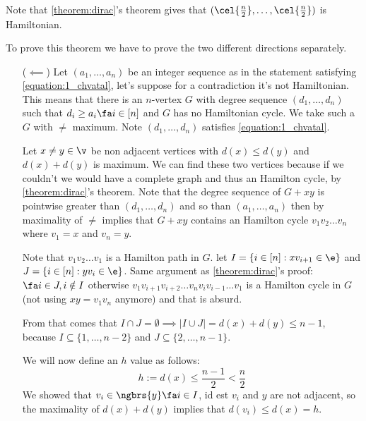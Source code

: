 Note that \ref{theorem:dirac}'s theorem gives that $(\cel{\frac{n}{2}}, \dots, \cel{\frac{n}{2}})$ is Hamiltonian.
\begin{prf}
    To prove this theorem we have to prove the two different directions separately.
    \begin{itemize}
        \item[($\impliedby$)] Let $(a_1, \dots, a_n)$ be an integer sequence as in the statement satisfying \ref{equation:1_chvatal}, let's suppose for a contradiction it's not Hamiltonian. This means that there is an $n$-vertex $G$ with degree sequence $(d_1, \dots, d_n)$ such that $d_i \geq a_i \fa i \in [n]$ and $G$ has no Hamiltonian cycle. We take such a $G$ with $\ne$ maximum. Note $(d_1, \dots, d_n)$ satisfies \ref{equation:1_chvatal}.
        
        Let $x \neq y \in \v$ be non adjacent vertices with $d(x) \leq d(y)$ and $d(x) + d(y)$ is maximum. We can find these two vertices because if we couldn't we would have a complete graph and thus an Hamilton cycle, by \ref{theorem:dirac}'s theorem. Note that the degree sequence of $G + xy$ is pointwise greater than $(d_1, \dots, d_n)$ and so than $(a_1, \dots, a_n)$ then by maximality of $\ne$ implies that $G + xy$ contains an Hamilton cycle $v_1v_2 \dots v_n$ where $v_1 = x$ and $v_n = y$.

        Note that $v_1v_2 \dots v_1$  is a Hamilton path in $G$. let $I = \{i \in [n]: xv_{i + 1} \in \e\}$ and $J = \{i \in [n]: yv_i \in \e\}$. Same argument as \ref{theorem:dirac}'s proof: $\fa i \in J, i \notin I$ otherwise $v_1 v_{i + 1} v_{i + 2} \dots v_n v_i v_{i - 1} \dots v_1$ is a Hamilton cycle in $G$ (not using $xy = v_1v_n$ anymore) and that is absurd.

        From that comes that $I \cap J = \emptyset \implies |I \cup J| = d(x) + d(y) \leq n - 1$, because $I \subseteq \{1, \dots, n - 2\}$ and $J \subseteq \{2, \dots, n - 1\}$.

        We will now define an $h$ value as follows:
        \begin{equation*}
            h := d(x) \leq \frac{n - 1}{2} < \frac{n}{2}
        \end{equation*}
        We showed that $v_i \in \ngbrs{y} \fa i \in I$, id est $v_i$ and $y$ are not adjacent, so the maximality of $d(x) + d(y)$ implies that $d(v_i) \leq d(x) = h$.


\end{itemize}
\end{prf}
